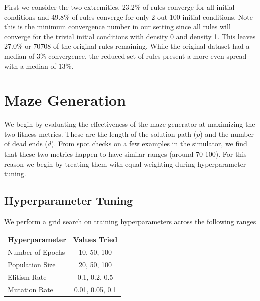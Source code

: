 First we consider the two extremities. 23.2\% of rules converge for all initial conditions and 49.8\% of rules converge for only 2 out 100 initial conditions. Note this is the minimum convergence number in our setting since all rules will converge for the trivial initial conditions with density 0 and density 1.  This leaves 27.0\% or 70708 of the original rules remaining. While the original dataset had a median of 3\% convergence, the reduced set of rules present a more even spread with a median of 13\%.

\section{Maze Generation}

We begin by evaluating the effectiveness of the maze generator at maximizing the two fitness metrics. These are the length of the solution path ($p$) and the number of dead ends ($d$). From spot checks on a few examples in the simulator, we find that these two metrics happen to have similar ranges (around 70-100). For this reason we begin by treating them with equal weighting during hyperparameter tuning.\\

\subsection{Hyperparameter Tuning} 

We perform a grid search on training hyperparameters across the following ranges
\begin{center}
    \begin{tabular}{ l c }
        \bf Hyperparameter & \bf Values Tried\\
        Number of Epochs & 10, 50, 100\\
        Population Size & 20, 50, 100\\
        Elitism Rate & 0.1, 0.2, 0.5\\
        Mutation Rate & 0.01, 0.05, 0.1\\
    \end{tabular}
\end{center}

